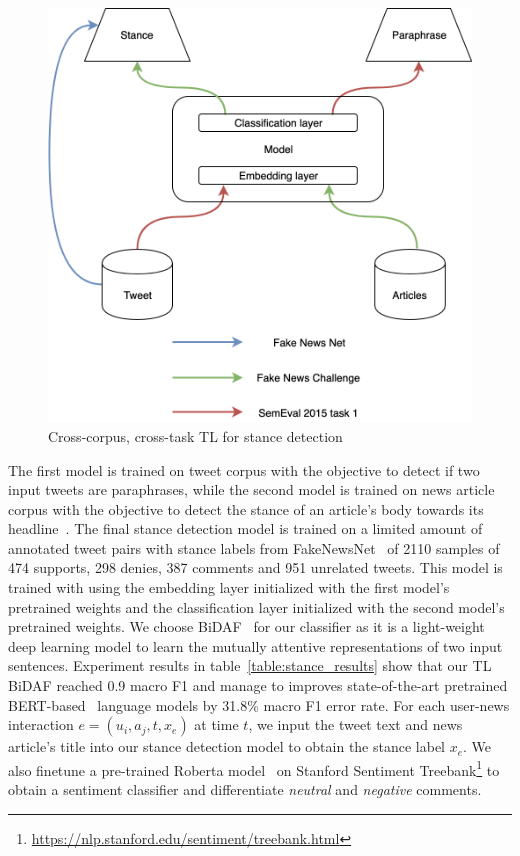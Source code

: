 \documentclass[fyp]{socreport}
\theoremstyle{definition}
\theoremstyle{hypothesis}
\begin{document}
\begin{figure}[t]
\centering
\includegraphics[scale=0.3]{transfer_learning.png}
\caption{Cross-corpus, cross-task TL for stance detection}
\label{fig:transfer_learning}
\end{figure}

The first model is trained on tweet corpus with the objective to detect if two input tweets are paraphrases, while the second model is trained on news article corpus with the objective to detect the stance of an article's body towards its headline~\cite{hanselowski2018retrospective}. The final stance detection model is trained on a limited amount of annotated tweet pairs with stance labels from FakeNewsNet~\cite{shu2018fakenewsnet} of 2110 samples of 474 supports, 298 denies, 387 comments and 951 unrelated tweets. This model is trained with using the embedding layer initialized with the first model's pretrained weights and the classification layer initialized with the second model's pretrained weights. We choose BiDAF~\cite{seo2016bidirectional} for our classifier as it is a light-weight deep learning model to learn the mutually attentive representations of two input sentences. Experiment results in table~\ref{table:stance_results} show that our TL BiDAF reached 0.9 macro F1 and manage to improves state-of-the-art pretrained BERT-based~\cite{devlin2019bert} language models by 31.8\% macro F1 error rate. For each user-news interaction $e=(u_i, a_j, t, x_e)$ at time $t$, we input the tweet text and news article's title into our stance detection model to obtain the stance label $x_e$. We also finetune a pre-trained Roberta model~\cite{liu2019roberta} on Stanford Sentiment Treebank\footnote{\scriptsize{\url{https://nlp.stanford.edu/sentiment/treebank.html}}} to obtain a sentiment classifier and differentiate \textit{neutral} and \textit{negative} comments.
\end{document}
